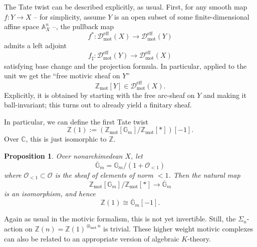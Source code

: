 \documentclass[11pt]{amsart}
\numberwithin{equation}{section}
\numberwithin{theorem}{section}
\newtheorem{proposition}[theorem]{Proposition}
\theoremstyle{definition}
\begin{document}
The Tate twist can be described explicitly, as usual. First, for any smooth map $f: Y\to X$ -- for simplicity, assume $Y$ is an open subset of some finite-dimensional affine space $\mathbb A^n_X$ --, the pullback map
\[
f^\ast: \mathcal D_{\mathrm{mot}}^{\mathrm{eff}}(X)\to \mathcal D_{\mathrm{mot}}^{\mathrm{eff}}(Y)
\]
admits a left adjoint
\[
f_\sharp: \mathcal D_{\mathrm{mot}}^{\mathrm{eff}}(Y)\to \mathcal D_{\mathrm{mot}}^{\mathrm{eff}}(X)
\]
satisfying base change and the projection formula. In particular, applied to the unit we get the ``free motivic sheaf on $Y$''
\[
\mathbb Z_{\mathrm{mot}}[Y]\in \mathcal D_{\mathrm{mot}}^{\mathrm{eff}}(X).
\]
Explicitly, it is obtained by starting with the free arc-sheaf on $Y$ and making it ball-invariant; this turns out to already yield a finitary sheaf.

In particular, we can define the first Tate twist
\[
\mathbb Z(1) := (\mathbb Z_{\mathrm{mot}}[\mathbb G_m]/\mathbb Z_{\mathrm{mot}}[\ast])[-1].
\]
Over $\mathbb C$, this is just isomorphic to $\mathbb Z$.

\begin{proposition} Over nonarchimedean $X$, let
\[
\overline{\mathbb G}_m = \mathbb G_m/(1+\mathcal O_{<1})
\]
where $\mathcal O_{<1}\subset \mathcal O$ is the sheaf of elements of norm $<1$. Then the natural map
\[
\mathbb Z_{\mathrm{mot}}[\mathbb G_m]/\mathbb Z_{\mathrm{mot}}[\ast]\to \overline{\mathbb G}_m
\]
is an isomorphism, and hence
\[
\mathbb Z(1)\cong \overline{\mathbb G}_m[-1].
\]
\end{proposition}

Again as usual in the motivic formalism, this is not yet invertible. Still, the $\Sigma_n$-action on $\mathbb Z(n) = \mathbb Z(1)^{\otimes_{\mathrm{mot}} n}$ is trivial. These higher weight motivic complexes can also be related to an appropriate version of algebraic $K$-theory.
\end{document}
